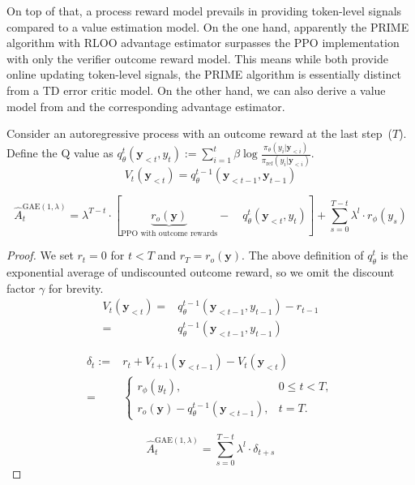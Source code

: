 \iffalse
On top of that, a process reward model prevails in providing token-level signals compared to a value estimation model. On the one hand, apparently the PRIME algorithm with RLOO advantage estimator surpasses the PPO implementation with only the verifier outcome reward model. This means while both provide online updating token-level signals, the PRIME algorithm is essentially distinct from a TD error critic model. On the other hand, we can also derive a value model from \cite{yuan2024freeprocessrewardsprocess} and the corresponding advantage estimator. 
\begin{proposition}\label{prop:implicit_value} 
Consider an autoregressive process with an outcome reward at the last step~($T$). Define the Q value as $q_\theta^t(\mathbf{y}_{<t}, y_t):= \sum_{i=1}^{t} \beta \log \frac{\pi_\theta(y_{i}|\mathbf{y}_{<i})}{\pi_\text{ref}(y_{i}|\mathbf{y}_{<i})}$. 
\begin{equation}
V_t(\mathbf{y}_{<t}) = q_\theta^{t-1}(\mathbf{y}_{<t-1},\mathbf{y}_{t-1})
\end{equation}

\begin{equation}
\hat A^{\text{GAE}(1,\lambda)}_t = \lambda^{T-t} \cdot
\left[ \underbrace{r_o\left(\mathbf{y}\right)}_\text{PPO with outcome rewards} - \quad q_\theta^t(\mathbf{y}_{<t}, y_t) 
\right] + \sum_{s=0}^{T-t} \lambda^l \cdot r_\phi(y_s)
\end{equation}

\end{proposition}

\begin{proof}
We set $r_t=0$ for $t<T$ and $r_T=r_o\left(\mathbf{y}\right)$. The above definition of $q^t_\theta$ is the exponential average of undiscounted outcome reward, so we omit the discount factor $\gamma$ for brevity. 
\begin{equation}
\begin{aligned}
V_t(\mathbf{y}_{<t}) =& q_\theta^{t-1}(\mathbf{y}_{<t-1}, y_{t-1}) - r_{t-1} \\
=&q_\theta^{t-1}(\mathbf{y}_{<t-1}, y_{t-1}) \nonumber
\end{aligned}
\end{equation}

\begin{equation}
\begin{aligned}
\delta_t:=&r_t+V_{t+1}(\mathbf{y}_{<t-1})-V_t(\mathbf{y}_{<t})\\
=&
\begin{cases}
  r_\phi(y_t),& 0\leq t < T,\\
  r_o(\mathbf{y})-q_\theta^{t-1}(\mathbf{y}_{<t-1}), & t = T.
\end{cases} \nonumber
\end{aligned}
\end{equation}

\begin{equation}
\hat A^{\text{GAE}(1,\lambda)}_t = \sum_{s=0}^{T-t} \lambda^l \cdot \delta_{t+s} \nonumber
\end{equation}
\end{proof}

